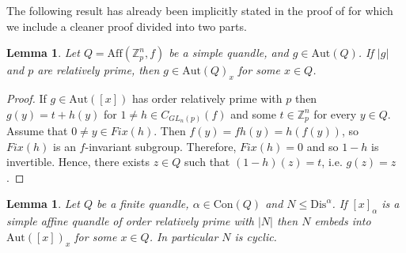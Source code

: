 \documentclass[a4paper, english, 9pt]{amsart}
\theoremstyle{plain}
\newtheorem{lemma}[theorem]{Lemma}
\theoremstyle{definition}
\def\aut#1{\mathrm{Aut}(#1)}
\def\aff#1{\mathrm{Aff}#1}
\def\dis{\mathrm{Dis}}
\def\con{\mathrm{Con}}
\def\Z{\mathbb Z}
\begin{document}
The following result has already been implicitly stated in the proof of \cite[Theorem 3.14]{LSS} for which we include a cleaner proof divided into two parts. 
\begin{lemma}\label{aut of simple}
    Let $Q=\aff(\Z_p^n, f)$ be a simple quandle, and $g\in \aut{Q}$. If $|g|$ and $p$ are relatively prime, then $g\in \aut{Q}_x$ for some $x\in Q$. 
\end{lemma}


\begin{proof}
   If $g\in \aut{[x]}$ has order relatively prime with $p$ then $g(y)=t+h(y)$ for $1\neq h\in C_{GL_n(p)}(f)$ and some $t\in \Z_p^n$ for every $y\in Q$. Assume that $0\neq y\in Fix(h)$. Then $f(y)=fh(y)=h(f(y))$, so $Fix(h)$ is an $f$-invariant subgroup. %
   Therefore, $Fix(h)=0$ and so $1-h$ is invertible. Hence, there exists $z\in Q$ such that $(1-h)(z)=t$, i.e. $g(z)=z$.
\end{proof}

\begin{lemma}\label{N cyclic}
    Let $Q$ be a finite quandle, $\alpha\in \con(Q)$ and $N\leq \dis^\alpha$. If $[x]_\alpha$ is a simple affine quandle of order relatively prime with $|N|$ then $N$ embeds into $\aut{[x]}_x$ for some $x\in Q$. In particular $N$ is cyclic.
\end{lemma}
  
 
\end{document}
